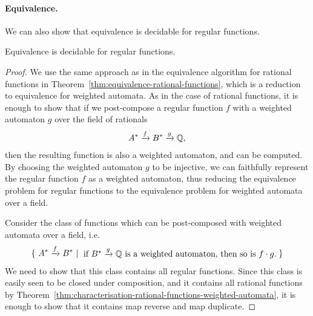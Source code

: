 \paragraph*{Equivalence.} We can also show that equivalence is decidable for regular functions.
\begin{theorem}\label{thm:decidable-equivalence-regular}
    Equivalence is decidable for regular functions.
\end{theorem}
\begin{proof}
    We use the same approach as in the equivalence algorithm for rational functions in Theorem~\ref{thm:equivalence-rational-functions}, which is a reduction to equivalence for weighted automata. As in the case of rational functions, it is enough to show that if we post-compose a regular function $f$ with a weighted automaton $g$ over the field of rationals
    \begin{align*}
    A^* \xrightarrow f B^* \xrightarrow g {\mathbb Q},
    \end{align*}
    then the resulting function  is also a weighted automaton, and can be computed. By choosing the weighted automaton $g$ to be injective, we can faithfully represent the regular function $f$ as a weighted automaton, thus reducing the equivalence problem for regular functions to the equivalence problem for weighted automata over a field.

    Consider the class of functions which can be post-composed with weighted automata over a field, i.e.~
    \begin{align*}
    \setbuild{ A^* \xrightarrow f B^*}{if $ B^* \xrightarrow g \Rat$ is a weighted automaton, then so is $f \cdot g$.}
    \end{align*}
    We need to show that this class contains all regular functions. Since this class is easily seen to be closed under composition, and it contains all rational functions by Theorem~\ref{thm:characterisation-rational-functions-weighted-automata}, it is enough to show that it contains map reverse and map duplicate.



\end{proof}
